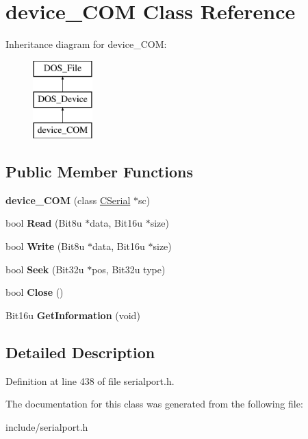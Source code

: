 \hypertarget{classdevice__COM}{\section{device\-\_\-\-C\-O\-M Class Reference}
\label{classdevice__COM}
}
Inheritance diagram for device\-\_\-\-C\-O\-M\-:\begin{figure}[H]
\begin{center}
\leavevmode
\includegraphics[height=3.000000cm]{classdevice__COM}
\end{center}
\end{figure}
\subsection*{Public Member Functions}
\begin{DoxyCompactItemize}
\item 
\hypertarget{classdevice__COM_a27121b64d7af922b43f2a440845f5f30}{{\bfseries device\-\_\-\-C\-O\-M} (class \hyperlink{classCSerial}{C\-Serial} $\ast$sc)}\label{classdevice__COM_a27121b64d7af922b43f2a440845f5f30}

\item 
\hypertarget{classdevice__COM_a1c1ae4216213b38d8df250b8a620d11d}{bool {\bfseries Read} (Bit8u $\ast$data, Bit16u $\ast$size)}\label{classdevice__COM_a1c1ae4216213b38d8df250b8a620d11d}

\item 
\hypertarget{classdevice__COM_a16ddf3df022d68a34db573f8f11ea5a3}{bool {\bfseries Write} (Bit8u $\ast$data, Bit16u $\ast$size)}\label{classdevice__COM_a16ddf3df022d68a34db573f8f11ea5a3}

\item 
\hypertarget{classdevice__COM_a6532f789b0eb77a8d821b7ebc8923edc}{bool {\bfseries Seek} (Bit32u $\ast$pos, Bit32u type)}\label{classdevice__COM_a6532f789b0eb77a8d821b7ebc8923edc}

\item 
\hypertarget{classdevice__COM_a5d00c77725eba731dc7d766d2746ccd3}{bool {\bfseries Close} ()}\label{classdevice__COM_a5d00c77725eba731dc7d766d2746ccd3}

\item 
\hypertarget{classdevice__COM_a0f83ae83d1102e5191189983a18e8766}{Bit16u {\bfseries Get\-Information} (void)}\label{classdevice__COM_a0f83ae83d1102e5191189983a18e8766}

\end{DoxyCompactItemize}


\subsection{Detailed Description}


Definition at line 438 of file serialport.\-h.



The documentation for this class was generated from the following file\-:\begin{DoxyCompactItemize}
\item 
include/serialport.\-h\end{DoxyCompactItemize}
